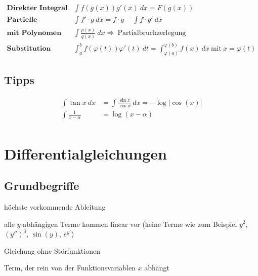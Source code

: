 \documentclass[11pt]{article}
\begin{document}
\begin{equation*}
\begin{split}
	\textbf{Direkter Integral}\quad & \int f(g(x))g'(x)\ dx = F(g(x)) \\
	\textbf{Partielle Integration}\quad & \int f' \cdot g\ dx = f \cdot g - \int f \cdot g'\ dx \\
	\textbf{mit Polynomen}\quad & \int\frac{p(x)}{q(x)}\ dx \Rightarrow\ \text{Partialbruchzerlegung} \\
	\textbf{Substitution}\quad & \int_a^b f(\varphi(t))\varphi'(t)\ dt = \int_{\varphi(a)}^{\varphi(b)} f(x)\ dx\ \text{mit}\ x = \varphi(t)
\end{split}
\end{equation*}

\subsection{Tipps}

\begin{equation*}
\begin{split}
	\int\tan x\ dx & = \int\frac{\sin x}{\cos x}\ dx = -\log|\cos(x)| \\
	\int \frac{1}{x - \alpha} & = \log(x-\alpha) \\
\end{split}
\end{equation*}

\section{Differentialgleichungen}

\subsection{Grundbegriffe}

\begin{description}[labelindent=16pt,style=multiline,leftmargin=3.5cm, noitemsep]
	\item[Ordnung:] h{\"o}chste vorkommende Ableitung
	\item[linear:] alle $y$-abh{\"a}ngigen Terme kommen linear vor (keine Terme wie zum Beispiel $y^2$, $(y'')^3$, $\sin(y)$, $e^{y'}$)
	\item[homogen:] Gleichung ohne St{\"o}rfunktionen
	\item[St{\"o}rfunktion:] Term, der rein von der Funktionsvariablen $x$ abh{\"a}ngt
\end{description}
\end{document}
